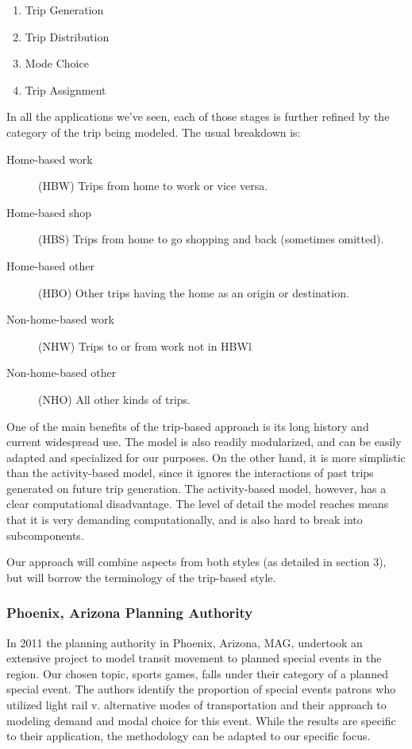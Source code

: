 \documentclass[12pt]{article}
\begin{document}
\begin{enumerate}
    \item Trip Generation
    \item Trip Distribution
    \item Mode Choice
    \item Trip Assignment
\end{enumerate}

In all the applications we've seen, each of those stages is further
refined by the category of the trip being modeled. The usual breakdown
is:

\begin{description}
  \item[Home-based work] (HBW) Trips from home to work or vice versa.
  \item[Home-based shop] (HBS) Trips from home to go shopping and back
(sometimes omitted).
  \item[Home-based other](HBO) Other trips having the home as an
origin or destination.
  \item[Non-home-based work] (NHW) Trips to or from work not in HBWl
  \item[Non-home-based other](NHO) All other kinds of trips.
\end{description}

One of the main benefits of the trip-based approach is its long
history and current widespread use. The model is also readily
modularized, and can be easily adapted and specialized for our
purposes. On the other hand, it is more simplistic than the
activity-based model, since it ignores the interactions of past trips
generated on future trip generation. The activity-based model,
however, has a clear computational disadvantage. The level of detail
the model reaches means that it is very demanding computationally, and
is also hard to break into subcomponents.

Our approach will combine aspects from both styles (as detailed in
section 3), but will borrow the terminology of the trip-based style.

\subsubsection{Phoenix, Arizona Planning Authority}
In 2011 the planning authority in Phoenix, Arizona, MAG, undertook an
extensive project to model transit movement to planned special events
in the region. \cite{kuppam11} Our chosen topic, sports games, falls
under their category of a planned special event. The authors identify
the proportion of special events patrons who utilized light rail
v. alternative modes of transportation and their approach to modeling
demand and modal choice for this event. While the results are specific
to their application, the methodology can be adapted to our specific
focus.
\end{document}
